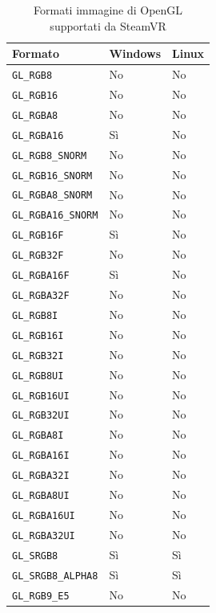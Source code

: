 \documentclass[twoside]{supsistudent}
\begin{document}
\begin{table}[H]
  \caption{Formati immagine di OpenGL supportati da SteamVR}
  \begin{center}
    \begin{tabular}{ l l l }
      Formato                    & Windows & Linux \\
      \hline
      \texttt{GL\_RGB8}          & No      & No    \\
      \texttt{GL\_RGB16}         & No      & No    \\
      \texttt{GL\_RGBA8}         & No      & No    \\
      \texttt{GL\_RGBA16}        & Sì      & No    \\
      \texttt{GL\_RGB8\_SNORM}   & No      & No    \\
      \texttt{GL\_RGB16\_SNORM}  & No      & No    \\
      \texttt{GL\_RGBA8\_SNORM}  & No      & No    \\
      \texttt{GL\_RGBA16\_SNORM} & No      & No    \\
      \texttt{GL\_RGB16F}        & Sì      & No    \\
      \texttt{GL\_RGB32F}        & No      & No    \\
      \texttt{GL\_RGBA16F}       & Sì      & No    \\
      \texttt{GL\_RGBA32F}       & No      & No    \\
      \texttt{GL\_RGB8I}         & No      & No    \\
      \texttt{GL\_RGB16I}        & No      & No    \\
      \texttt{GL\_RGB32I}        & No      & No    \\
      \texttt{GL\_RGB8UI}        & No      & No    \\
      \texttt{GL\_RGB16UI}       & No      & No    \\
      \texttt{GL\_RGB32UI}       & No      & No    \\
      \texttt{GL\_RGBA8I}        & No      & No    \\
      \texttt{GL\_RGBA16I}       & No      & No    \\
      \texttt{GL\_RGBA32I}       & No      & No    \\
      \texttt{GL\_RGBA8UI}       & No      & No    \\
      \texttt{GL\_RGBA16UI}      & No      & No    \\
      \texttt{GL\_RGBA32UI}      & No      & No    \\
      \texttt{GL\_SRGB8}         & Sì      & Sì    \\
      \texttt{GL\_SRGB8\_ALPHA8} & Sì      & Sì    \\
      \texttt{GL\_RGB9\_E5}      & No      & No    \\
    \end{tabular}
  \end{center}
\end{table}
\end{document}
